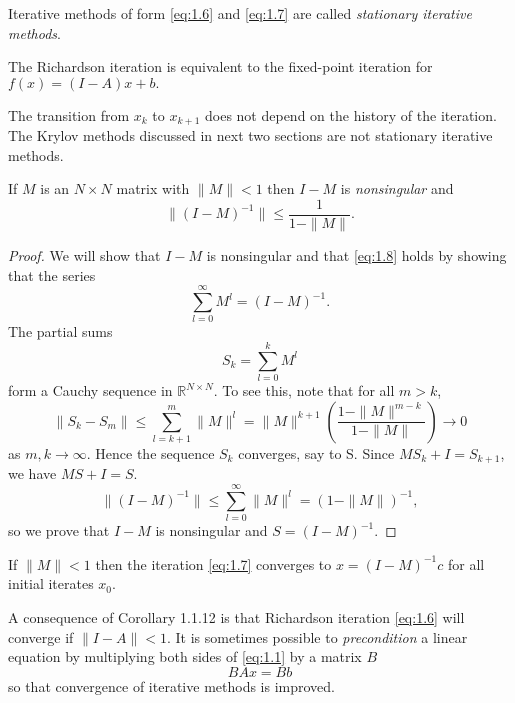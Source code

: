 \begin{defi}
  Iterative methods of form \eqref{eq:1.6} and \eqref{eq:1.7} are
  called \emph{stationary iterative methods}.
\end{defi}
\begin{rmk}
  The Richardson iteration is equivalent to the fixed-point iteration
  for $f(x)=(I-A)x+b.$
\end{rmk}
\begin{rmk}
  The transition from $x_k$ to $x_{k+1}$ does not depend on the
  history of the iteration. The Krylov methods discussed in next two
  sections are not stationary iterative methods.
\end{rmk}

\begin{lemma}
  If $M$ is an $N\times N$ matrix with $\|M\|<1$ then $I-M$ is
  \emph{nonsingular} and
  \begin{equation}
    \label{eq:1.8}
    \|(I-M)^{-1}\|\leq \frac{1}{1-\|M\|}.
  \end{equation}
\end{lemma}

\begin{proof}
  We will show that $I-M$ is nonsingular and that \eqref{eq:1.8} holds
  by showing that the series $$\sum\limits_{l=0}^{\infty}M^l =
  (I-M)^{-1}.$$
  The partial sums $$S_k=\sum\limits_{l=0}^kM^l$$
  form a Cauchy sequence in $\mathbb{R}^{N\times N}$. To see this, note
  that for all $m>k$,
  $$\|S_k-S_m\|\leq\sum\limits_{l=k+1}^m\|M\|^l = \|M\|^{k+1}\left(
    \frac{1-\|M\|^{m-k}}{1-\|M\|}\right) \rightarrow 0$$
  as $m,k\rightarrow\infty$. Hence the sequence $S_k$ converges, say
  to S. Since $MS_k+I=S_{k+1}$, we have $MS+I=S$.
  $$\|(I-M)^{-1}\|\leq\sum\limits_{l=0}^{\infty}\|M\|^l=(1-\|M\|)^{-1},$$
  so we prove that $I-M$ is nonsingular and $S=(I-M)^{-1}$.
\end{proof}

\begin{coro}
  If $\|M\|<1$ then the iteration \eqref{eq:1.7} converges to
  $x=(I-M)^{-1}c$ for all initial iterates $x_0$.
\end{coro}

\begin{rmk}
  A consequence of Corollary 1.1.12 is that Richardson iteration
  \eqref{eq:1.6} will converge if $\|I-A\|<1$. It is sometimes
  possible to \emph{precondition} a linear equation by multiplying both sides
  of \eqref{eq:1.1} by a matrix $B$ $$BAx=Bb$$
  so that convergence of iterative methods is improved.
\end{rmk}

